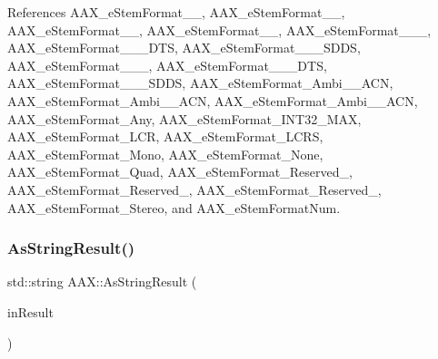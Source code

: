 References A\+A\+X\+\_\+e\+Stem\+Format\+\_\+\_, A\+A\+X\+\_\+e\+Stem\+Format\+\_\+\_, A\+A\+X\+\_\+e\+Stem\+Format\+\_\+\_, A\+A\+X\+\_\+e\+Stem\+Format\+\_\+\_, A\+A\+X\+\_\+e\+Stem\+Format\+\_\+\_\+\_, A\+A\+X\+\_\+e\+Stem\+Format\+\_\+\_\+\_\+\+D\+TS, A\+A\+X\+\_\+e\+Stem\+Format\+\_\+\_\+\_\+\+S\+D\+DS, A\+A\+X\+\_\+e\+Stem\+Format\+\_\+\_\+\_, A\+A\+X\+\_\+e\+Stem\+Format\+\_\+\_\+\_\+\+D\+TS, A\+A\+X\+\_\+e\+Stem\+Format\+\_\+\_\+\_\+\+S\+D\+DS, A\+A\+X\+\_\+e\+Stem\+Format\+\_\+\+Ambi\+\_\+\_\+\+A\+CN, A\+A\+X\+\_\+e\+Stem\+Format\+\_\+\+Ambi\+\_\+\_\+\+A\+CN, A\+A\+X\+\_\+e\+Stem\+Format\+\_\+\+Ambi\+\_\+\_\+\+A\+CN, A\+A\+X\+\_\+e\+Stem\+Format\+\_\+\+Any, A\+A\+X\+\_\+e\+Stem\+Format\+\_\+\+I\+N\+T32\+\_\+\+M\+AX, A\+A\+X\+\_\+e\+Stem\+Format\+\_\+\+L\+CR, A\+A\+X\+\_\+e\+Stem\+Format\+\_\+\+L\+C\+RS, A\+A\+X\+\_\+e\+Stem\+Format\+\_\+\+Mono, A\+A\+X\+\_\+e\+Stem\+Format\+\_\+\+None, A\+A\+X\+\_\+e\+Stem\+Format\+\_\+\+Quad, A\+A\+X\+\_\+e\+Stem\+Format\+\_\+\+Reserved\+\_, A\+A\+X\+\_\+e\+Stem\+Format\+\_\+\+Reserved\+\_, A\+A\+X\+\_\+e\+Stem\+Format\+\_\+\+Reserved\+\_, A\+A\+X\+\_\+e\+Stem\+Format\+\_\+\+Stereo, and A\+A\+X\+\_\+e\+Stem\+Format\+Num.

\mbox{\label{a00852_a354029650cebc5f23636c9984a65ea0d}} 
\subsubsection{\texorpdfstring{AsStringResult()}{AsStringResult()}}
{\footnotesize\ttfamily std\+::string A\+A\+X\+::\+As\+String\+Result (\begin{DoxyParamCaption}\item[{\mbox{\hyperlink{a00392_a4d8f69a697df7f70c3a8e9b8ee130d2f}{A\+A\+X\+\_\+\+Result}}}]{in\+Result }\end{DoxyParamCaption})\hspace{0.3cm}{\ttfamily [inline]}}



